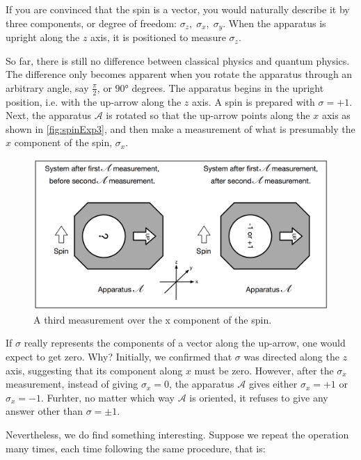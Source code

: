 \documentclass[a4paper,10pt]{article}
\begin{document}
If you are convinced that the spin is a vector, you would naturally describe it by three components, or degree of freedom: $\sigma_z, \; \sigma_x, \; \sigma_y$. When the apparatus is upright along the $z$ axis, it is positioned to measure $\sigma_z$. 

So far, there is still no difference between classical physics and quantum physics. The difference only becomes apparent when you rotate the apparatus through an arbitrary angle, say $\frac{\pi}{2}$, or $\ang{90}$ degrees. The apparatus begins in the upright position, i.e. with the up-arrow along the $z$ axis. A spin is prepared with $\sigma = +1$. Next, the apparatus $\mathcal{A}$ is rotated so that the up-arrow points along the $x$ axis as shown in \autoref{fig:spinExp3}, and then make a measurement of what is presumably the $x$ component of the spin, $\sigma_x$.

\begin{figure}[!htb]
\begin{center}
\includegraphics[width=4.55in]{images/spinExp3.png}
\caption{A third measurement over the x component of the spin.}
\label{fig:spinExp3}
\end{center}
\end{figure}

If $\sigma$ really represents the components of a vector along the up-arrow, one would expect to get zero. Why? Initially, we confirmed that $\sigma$ was directed along the $z$ axis, suggesting that its component along $x$ must be zero. However, after the $\sigma_x$ measurement, instead of giving $\sigma_x = 0$, the apparatus $\mathcal{A}$ gives either $\sigma_x = +1$ or $\sigma_x = -1$. Furhter, no matter which way $\mathcal{A}$ is oriented, it refuses to give any answer other than $\sigma = \pm1$.

Nevertheless, we do find something interesting. Suppose we repeat the operation many times, each time following the same procedure, that is:
\end{document}
